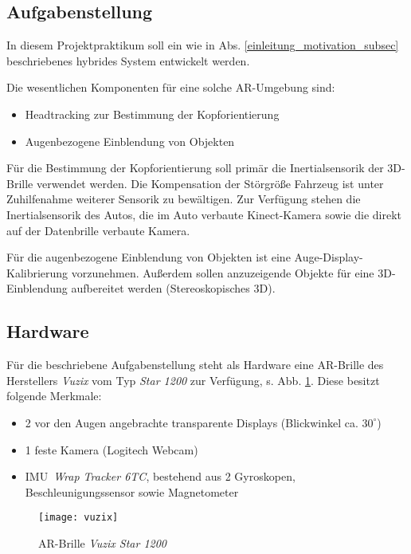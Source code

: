 \subsection{Aufgabenstellung}
\label{einleitung_aufgabenstellung_subsec}


In diesem Projektpraktikum soll ein wie in Abs. \ref{einleitung_motivation_subsec} beschriebenes hybrides System entwickelt werden.

Die wesentlichen Komponenten für eine solche AR-Umgebung sind:
\begin{itemize}
  \item Headtracking zur Bestimmung der Kopforientierung
  \item Augenbezogene Einblendung von Objekten
\end{itemize}

Für die Bestimmung der Kopforientierung soll primär die Inertialsensorik der 3D-Brille verwendet werden.
Die Kompensation der Störgröße Fahrzeug ist unter Zuhilfenahme weiterer Sensorik zu bewältigen.
Zur Verfügung stehen die Inertialsensorik des Autos, die im Auto verbaute Kinect-Kamera sowie die direkt auf der Datenbrille verbaute Kamera.

Für die augenbezogene Einblendung von Objekten ist eine Auge-Display-Kalibrierung vorzunehmen.
Außerdem sollen anzuzeigende Objekte für eine 3D-Einblendung aufbereitet werden (Stereoskopisches 3D).





\subsection{Hardware}
\label{einleitung_hardware_subsec}

Für die beschriebene Aufgabenstellung steht als Hardware eine AR-Brille des Herstellers \emph{Vuzix} vom Typ \emph{Star 1200} zur Verfügung, s. Abb. \ref{fig:vuzix_star_1200}.
Diese besitzt folgende Merkmale:
\begin{itemize}
  \item 2 vor den Augen angebrachte transparente Displays (Blickwinkel ca. $30^\circ$)
  \item 1 feste Kamera (Logitech Webcam)
  \item IMU\ \emph{Wrap Tracker 6TC}, bestehend aus 2 Gyroskopen, Beschleunigungssensor sowie Magnetometer
\end{itemize}

\begin{figure}[h]
  \centering
  \texttt{[image: vuzix]}
  \caption{AR-Brille \emph{Vuzix Star 1200}\ \cite{vuzix}}
  \label{fig:vuzix_star_1200}
\end{figure}
